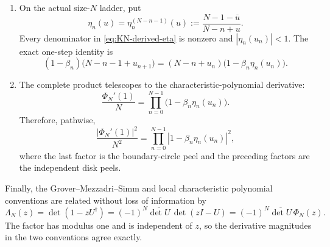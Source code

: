 \begin{theorem}
\begin{enumerate}
 \item On the actual size-$N$ ladder, put
 \begin{equation}
  \eta_n(u)=\eta_n^{(N-n-1)}(u)
  :=\frac{N-1-\overline u}{N-n+u}.
  \label{eq:KN-derived-eta}
 \end{equation}
 Every denominator in \eqref{eq:KN-derived-eta} is nonzero and
 $|\eta_n(u_n)|<1$.  The exact one-step identity is
 \begin{equation}
  (1-\beta_n)\bigl(N-n-1+u_{n+1}\bigr)
  =(N-n+u_n)\bigl(1-\beta_n\eta_n(u_n)\bigr).
  \label{eq:KN-one-step-telescope}
 \end{equation}

 \item The complete product telescopes to the characteristic-polynomial derivative:
 \begin{equation}
  \frac{\Phi_N'(1)}{N}
  =\prod_{n=0}^{N-1}\bigl(1-\beta_n\eta_n(u_n)\bigr).
  \label{eq:KN-complete-peel}
 \end{equation}
 Therefore, pathwise,
 \begin{equation}
  \frac{|\Phi_N'(1)|^2}{N^2}
  =\prod_{n=0}^{N-1}|1-\beta_n\eta_n(u_n)|^2,
  \label{eq:KN-complete-peel-modulus}
 \end{equation}
 where the last factor is the boundary-circle peel and the preceding factors are the
 independent disk peels.
\end{enumerate}
Finally, the Grover--Mezzadri--Simm and local characteristic polynomial conventions are
related without loss of information by
\begin{equation}
 \Lambda_N(z)=\det(1-zU^\dagger)
 =(-1)^N\overline{\det U}\,\det(zI-U)
 =(-1)^N\overline{\det U}\,\Phi_N(z).
 \label{eq:GMS-Phi-exact-phase}
\end{equation}
The factor has modulus one and is independent of $z$, so the derivative magnitudes in the
two conventions agree exactly.
\end{theorem}


